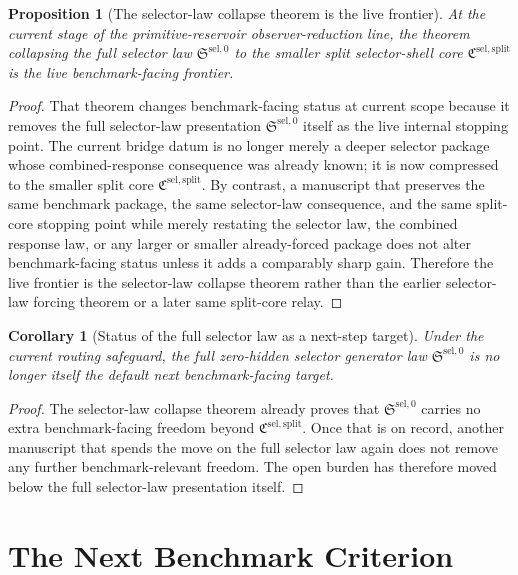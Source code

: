 \documentclass[11pt]{article}
\newcommand{\SelectorLaw}{\mathfrak S^{\mathrm{sel},0}}
\newcommand{\SelectorCore}{\mathfrak C^{\mathrm{sel,split}}}
\newtheorem{proposition}{Proposition}
\newtheorem{corollary}{Corollary}
\begin{document}
\begin{proposition}[The selector-law collapse theorem is the live frontier]
At the current stage of the primitive-reservoir observer-reduction line, the theorem collapsing the full selector law \(\SelectorLaw\) to the smaller split selector-shell core \(\SelectorCore\) is the live benchmark-facing frontier.
\end{proposition}

\begin{proof}
That theorem changes benchmark-facing status at current scope because it removes the full selector-law presentation \(\SelectorLaw\) itself as the live internal stopping point. The current bridge datum is no longer merely a deeper selector package whose combined-response consequence was already known; it is now compressed to the smaller split core \(\SelectorCore\). By contrast, a manuscript that preserves the same benchmark package, the same selector-law consequence, and the same split-core stopping point while merely restating the selector law, the combined response law, or any larger or smaller already-forced package does not alter benchmark-facing status unless it adds a comparably sharp gain. Therefore the live frontier is the selector-law collapse theorem rather than the earlier selector-law forcing theorem or a later same split-core relay.
\end{proof}

\begin{corollary}[Status of the full selector law as a next-step target]
Under the current routing safeguard, the full zero-hidden selector generator law \(\SelectorLaw\) is no longer itself the default next benchmark-facing target.
\end{corollary}

\begin{proof}
The selector-law collapse theorem already proves that \(\SelectorLaw\) carries no extra benchmark-facing freedom beyond \(\SelectorCore\). Once that is on record, another manuscript that spends the move on the full selector law again does not remove any further benchmark-relevant freedom. The open burden has therefore moved below the full selector-law presentation itself.
\end{proof}

\section{The Next Benchmark Criterion}
\end{document}
